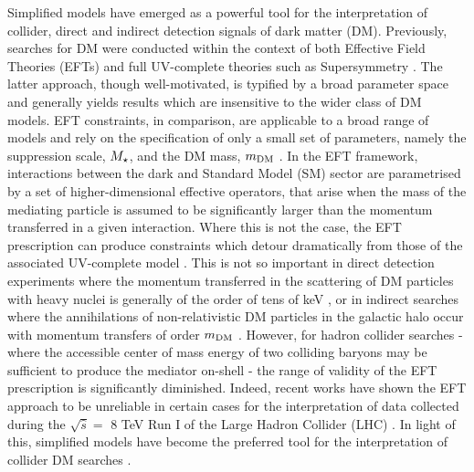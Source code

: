 
Simplified models have emerged as a powerful tool for the interpretation of collider, direct and indirect detection signals of dark matter (DM). Previously,  searches for DM were conducted within the context of both Effective Field Theories (EFTs) \cite{Aad:1363019, ATLAS-CONF-2012-147, CMS-PAS-EXO-12-048, Buckley:2013jwa, Abdallah:1472683, MonoX} and full UV-complete theories such as Supersymmetry \cite{ComppMSSM, Aad:2012ms, Aad:2012fqa, Aad:2014wea, SUSY_official_paper}. The latter approach, though well-motivated, is typified by a broad parameter space and generally yields results which are insensitive to the wider class of DM models. EFT constraints, in comparison, are applicable to a broad range of models and rely on the specification of only a small set of parameters, namely the suppression scale, $M_{\star}$, and the DM mass, $m_{\mathrm{DM}}$ \cite{DMCons2}.
In the EFT framework, interactions between the dark and Standard Model (SM) sector are parametrised by a set of higher-dimensional effective operators, that arise when the mass of the mediating particle is assumed to be significantly larger than the momentum transferred in a given interaction. Where this is not the case, the EFT prescription can produce constraints which detour dramatically from those of the associated UV-complete model \cite{Bai:2010hh, DMCons2, Fox:2011fx, Graesser:2011vj, An:2011ck}. This is not so important in direct detection experiments where the momentum transferred in the scattering of DM particles with heavy nuclei is generally of the order of tens of keV \cite{EFTDM, DMCons3}, or in indirect searches where the annihilations of non-relativistic DM particles in the galactic halo occur with momentum transfers of order $m_{\mathrm{DM}}$ \cite{}. However, for hadron collider searches - where the accessible center of mass energy of two colliding baryons may be sufficient to produce the mediator on-shell - the range of validity of the EFT prescription is significantly diminished. Indeed, recent works have shown the EFT approach to be unreliable in certain cases for the interpretation of data collected during the $\sqrt{\hat{s}} =$ 8 TeV Run I of the Large Hadron Collider (LHC) \cite{ValidEFT, ValidEFT_part2, ValidEFT_part3}. In light of this, simplified models have become the preferred tool for the interpretation of collider DM searches \cite{DM_MET_LHC, DMOxfordReport, DMForumReport, Harris:2014hga,Buchmueller:2014yoa}.

